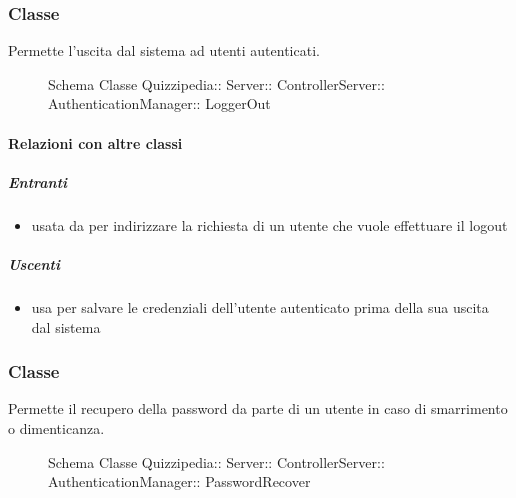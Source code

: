 \subsubsection{Classe }
Permette l'uscita dal sistema ad utenti autenticati.
\begin{figure}[H]
\centering
\noindent{}
\caption[Schema Classe LoggerOut]{Schema Classe Quizzipedia:: Server:: ControllerServer:: AuthenticationManager:: LoggerOut}
\end{figure}
\paragraph{Relazioni con altre classi}
\subparagraph{Entranti}
\begin{itemize}
\item usata da  per indirizzare la richiesta di un utente che vuole effettuare il logout
\end{itemize}
\subparagraph{Uscenti}
\begin{itemize}
\item usa  per salvare le credenziali dell'utente autenticato prima della sua uscita dal sistema
\end{itemize}
\subsubsection{Classe }
Permette il recupero della password da parte di un utente in caso di smarrimento o dimenticanza.
\begin{figure}[H]
\centering
\noindent{}
\caption[Schema Classe PasswordRecover]{Schema Classe Quizzipedia:: Server:: ControllerServer:: AuthenticationManager:: PasswordRecover}
\end{figure}
